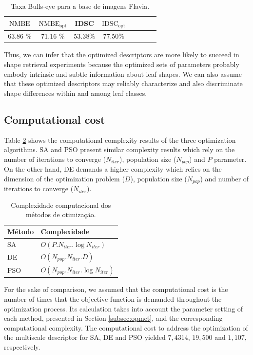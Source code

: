 {\begin{table}[h!]
\centering
\caption{Taxa Bulls-eye para a base de imagens Flavia.}
\label{table_bull_eyes_leaves}
  \begin{tabular}{cccccccc}
  \toprule[1.5pt]
 $\operatorname{NMBE}$ & $\operatorname{NMBE_{opt}}$ & IDSC    & $\operatorname{IDSC_{opt}}$\\ \midrule
     63.86 \%  & 71.16 \%  & 53.38\%    & 77.50\%       \\
  \bottomrule[1.5pt]
  \end{tabular}
\end{table}

Thus, we can infer that the optimized descriptors are more likely to succeed in shape retrieval experiments because the optimized sets of parameters probably embody intrinsic and subtle information about leaf shapes. We can also assume that these optimized descriptors may reliably characterize and also discriminate shape differences within and among leaf classes. 

\subsection{Computational cost \label{sec:comp_cost}}

Table \ref{tbl:complexity} shows the computational complexity results of the three optimization algorithms. SA and PSO present similar complexity results which rely on the number of iterations to converge ($N_{iter}$), population size ($N_{pop}$) and $P$ parameter. On the other hand,  DE  demands a higher complexity which relies on the dimension of the optimization problem ($D$), population size ($N_{pop}$) and number of iterations to converge ($N_{iter}$).

\begin{table}[h!]
\centering
\caption{Complexidade computacional dos métodos de otimização.}
\label{tbl:complexity}
  \begin{tabular}{ll}
  \toprule[1.5pt]
 Método & Complexidade\\
 \midrule
   SA  & $O(P.N_{iter}.\log{N_{iter}})$    \\
   DE  & $O(N_{pop}.N_{iter}.D)$   \\
   PSO&  $O(N_{pop}.N_{iter}.\log{N_{iter}})$\\
  \bottomrule[1.5pt]
  \end{tabular}
\end{table}

For the sake of comparison, we assumed that the computational cost is the number of times that the objective function is demanded throughout the optimization process. Its calculation takes into account the parameter setting of each method, presented in Section \ref{subsec:opmet}, and the corresponding computational complexity.  The computational cost to address the optimization of the multiscale descriptor for SA, DE and PSO yielded $7,4314$, $19,500$ and $1,107$, respectively. 

}
